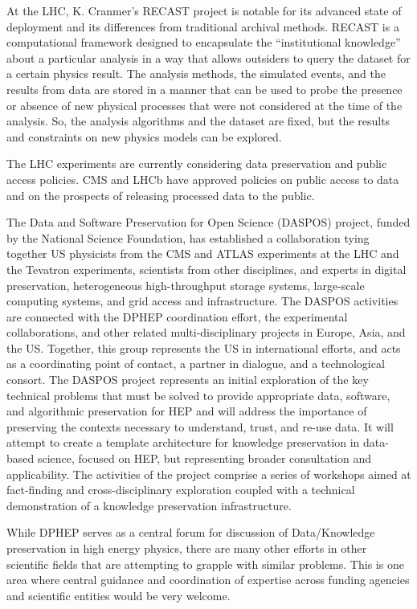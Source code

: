 At the LHC, K. Cranmer’s RECAST project\cite{RECAST} is notable for its advanced state of deployment and its differences from traditional archival methods.  RECAST is a computational framework designed to encapsulate the “institutional knowledge” about a particular analysis in a way that allows outsiders to query the dataset for a certain physics result.  The analysis methods, the simulated events, and the results from data are stored in a manner that can be used to probe the presence or absence of new physical processes that were not considered at the time of the analysis.  So, the analysis algorithms and the dataset are fixed, but the results and constraints on new physics models can be explored.  

The LHC experiments are currently considering data preservation and public access policies.  CMS and LHCb have approved policies on public access to data and on the prospects of releasing processed data to the public.

The Data and Software Preservation for Open Science (DASPOS) project, funded by the National Science Foundation, has established a collaboration tying together US physicists from the CMS and ATLAS experiments at the LHC and the Tevatron experiments, scientists from other disciplines, and experts in digital preservation, heterogeneous high-throughput storage systems, large-scale computing systems, and grid access and infrastructure. The DASPOS activities are connected with the DPHEP coordination effort, the experimental collaborations, and other related multi-disciplinary projects in Europe, Asia, and the US. Together, this group represents the US in international efforts, and acts as a coordinating point of contact, a partner in dialogue, and a technological consort.  The DASPOS project represents an initial exploration of the key technical problems that must be solved to provide appropriate data, software, and algorithmic preservation for HEP and will address the importance of preserving the contexts necessary to understand, trust, and re-use data. It will attempt to create a template architecture for
knowledge preservation in data-based science, focused on HEP, but representing broader consultation and applicability.  The 
activities of the project comprise a series of workshops aimed at fact-finding and cross-disciplinary exploration coupled with a technical demonstration of a knowledge preservation infrastructure.

While DPHEP serves as a central forum for discussion of Data/Knowledge preservation in high energy physics, there are many other efforts in other scientific fields that are attempting to grapple with similar problems.  This is one area where central guidance and coordination of expertise across funding agencies and scientific entities would be very welcome.

